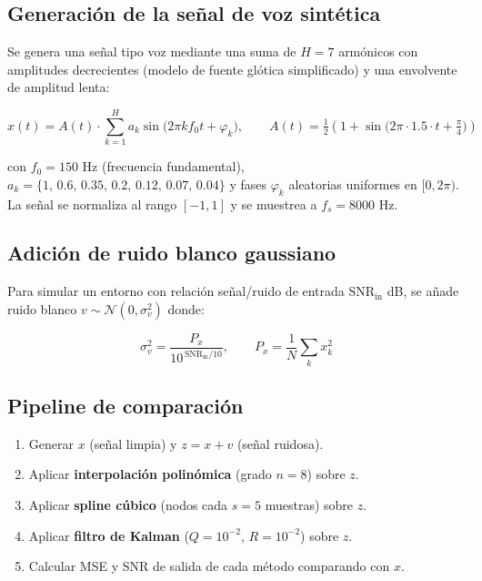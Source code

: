 \documentclass[12pt,a4paper]{article}
\begin{document}
\subsection{Generación de la señal de voz sintética}

Se genera una señal tipo voz mediante una suma de $H = 7$ armónicos con amplitudes
decrecientes (modelo de fuente glótica simplificado) y una envolvente de amplitud lenta:

\begin{equation}
  x(t) = A(t) \cdot \sum_{k=1}^{H} a_k \sin\!\bigl(2\pi k f_0 t + \varphi_k\bigr),
  \qquad A(t) = \tfrac{1}{2}\!\left(1 + \sin\!\bigl(2\pi \cdot 1.5\cdot t + \tfrac{\pi}{4}\bigr)\right)
\end{equation}

con $f_0 = 150$ Hz (frecuencia fundamental), $a_k = \{1,\,0.6,\,0.35,\,0.2,\,0.12,\,0.07,\,0.04\}$
y fases $\varphi_k$ aleatorias uniformes en $[0, 2\pi)$.
La señal se normaliza al rango $[-1, 1]$ y se muestrea a $f_s = 8000$ Hz.

\subsection{Adición de ruido blanco gaussiano}

Para simular un entorno con relación señal/ruido de entrada $\mathrm{SNR_{in}}$ dB,
se añade ruido blanco $v \sim \mathcal{N}(0, \sigma_v^2)$ donde:

\begin{equation}
  \sigma_v^2 = \frac{P_x}{10^{\,\mathrm{SNR_{in}}/10}}, \qquad P_x = \frac{1}{N}\sum_k x_k^2
\end{equation}

\subsection{Pipeline de comparación}

\begin{enumerate}
  \item Generar $x$ (señal limpia) y $z = x + v$ (señal ruidosa).
  \item Aplicar \textbf{interpolación polinómica} (grado $n = 8$) sobre $z$.
  \item Aplicar \textbf{spline cúbico} (nodos cada $s = 5$ muestras) sobre $z$.
  \item Aplicar \textbf{filtro de Kalman} ($Q = 10^{-2}$, $R = 10^{-2}$) sobre $z$.
  \item Calcular MSE y SNR de salida de cada método comparando con $x$.
\end{enumerate}
\end{document}
